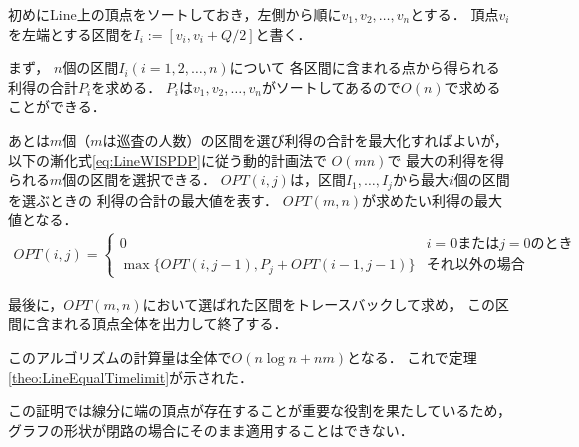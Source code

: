 初めにLine上の頂点をソートしておき，左側から順に$v_1,v_2,\ldots,v_n$とする．
頂点$v_i$を左端とする区間を$I_i := [v_i, v_i + Q/2]$と書く．

まず，
$n$個の区間$I_i (i = 1,2,\ldots, n)$について
各区間に含まれる点から得られる利得の合計$P_i$を求める．
$P_i$は$v_1,v_2,\ldots,v_n$がソートしてあるので$O(n)$で求めることができる．

あとは$m$個（$m$は巡査の人数）の区間を選び利得の合計を最大化すればよいが，
以下の漸化式\ref{eq:LineWISPDP}に従う動的計画法で
$O(mn)$で
最大の利得を得られる$m$個の区間を選択できる．
$OPT(i,j)$は，区間$I_1, \ldots, I_j$から最大$i$個の区間を選ぶときの
利得の合計の最大値を表す．
$OPT(m,n)$が求めたい利得の最大値となる．
\begin{align}
  \label{eq:LineWISPDP}
  OPT(i,j) = 
  \begin{cases}
    0 & \text{$i = 0$または$j = 0$のとき} \\
    \max \{
      OPT(i, j - 1), 
      P_j + OPT(i - 1, j - 1)
    \}
    & \text{それ以外の場合}
  \end{cases}
\end{align}

最後に，$OPT(m,n)$において選ばれた区間をトレースバックして求め，
この区間に含まれる頂点全体を出力して終了する．

このアルゴリズムの計算量は全体で$O(n \log n + nm)$となる．
これで定理\ref{theo:LineEqualTimelimit}が示された．


この証明では線分に端の頂点が存在することが重要な役割を果たしているため，
グラフの形状が閉路の場合にそのまま適用することはできない．
